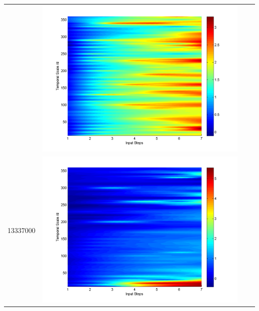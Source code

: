 \documentclass[11pt]{article}
\begin{document}
\begin{table}[H]
{\begin{tabular}{c  c   c   c  }
&\begin{minipage}{.3\textwidth}\includegraphics[width=\linewidth]{resultgraph/12459000pepq.png}\end{minipage}
\\
13337000&\begin{minipage}{.3\textwidth}\includegraphics[width=\linewidth]{resultgraph/13337000p.png}\end{minipage}

\end{tabular}}
\end{table}
\end{document}
